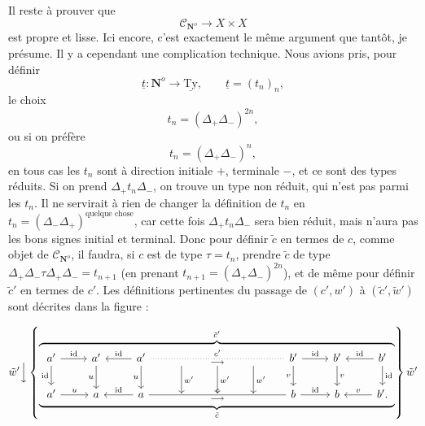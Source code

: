\documentclass[11pt]{article}
\newcommand{\printedpage}[1]{\marginpar{\footnotesize p.~#1}}
\newcommand{\msp}[1]{\marginpar{\footnotesize [#1]}}
\newcommand{\CN}{\mathcal{C}_{\mathbf{N}^o}}
\begin{document}
Il reste à prouver que
\[ \CN \longrightarrow X \times X \]
est propre et lisse. Ici encore,
\msp{page 167}
c'est exactement le même argument que tantôt, je présume. Il y a cependant une complication technique. Nous avions pris, pour définir
\[ \underline{t} : \mathbf{N}^o \longrightarrow \underline{\mathrm{Ty}}, \qquad \underline{t} = (t_n)_n, \]
le choix
\[ t_n = (\Delta_+\Delta_-)^{2n}, \]
ou si on préfère
\[ t_n = (\Delta_+\Delta_-)^n, \]
en tous cas les $t_n$ sont à direction initiale $+$, terminale $-$, et ce sont des types réduits. Si on prend $\Delta_+t_n\Delta_-$, on trouve un type non réduit, qui n'est pas parmi les $t_n$. Il ne servirait à rien de changer la définition de $t_n$ en $t_n = (\Delta_-\Delta_+)^{\text{quelque chose}}$, car cette fois $\Delta_+t_n\Delta_-$ sera bien réduit, mais n'aura pas les bons signes initial et terminal. Donc pour définir $\tilde{c}$ en termes de $c$, comme objet de $\CN$, il faudra, si $c$ est de type $\tau = t_n$, prendre $\tilde{c}$ de type $\Delta_+\Delta_-\tau\Delta_+\Delta_- = t_{n+1}$ (en prenant $t_{n+1} = (\Delta_+\Delta_-)^{2n}$), et de même pour définir $\tilde{c}'$ en termes de $c'$. Les définitions pertinentes du passage de $(c',w')$ à $(\tilde{c}',\tilde{w}')$ sont décrites dans la figure : %

\msp{page 168}

\printedpage{105}
\[
\tilde{w}'\Big\downarrow
\left\{
\overbrace{\underbrace{
\begin{tikzcd}[ampersand replacement=\&]
a' \arrow[r, "\mathrm{id}"] \arrow[d, "\mathrm{id}"'] \& a' \arrow[d, "u"'] \& a' \arrow[l, "\mathrm{id}"'] \arrow[d, "u"'] \arrow[rrrr, dotted, no head, "c'", "\longrightarrow"'] \& {} \arrow[d, "w'"] \& {} \arrow[d, "w'"] \& {} \arrow[d, "w'"] \& b' \arrow[r, "\mathrm{id}"] \arrow[d, "v"'] \& b' \arrow[d, "v"] \& b' \arrow[l, "\mathrm{id}"'] \arrow[d, "\mathrm{id}"] \\
a' \arrow[r, "u"] \& a \& a \arrow[l, "\mathrm{id}"'] \arrow[rrrr, no head, "c", "\longrightarrow"'] \& {} \& {} \& {} \& b \arrow[r, "\mathrm{id}"] \& b \& b'. \arrow[l, "v"']
\end{tikzcd}
}_{\tilde{c}}}^{\tilde{c}'}
\right\}
\tilde{w}'
\]
\end{document}
